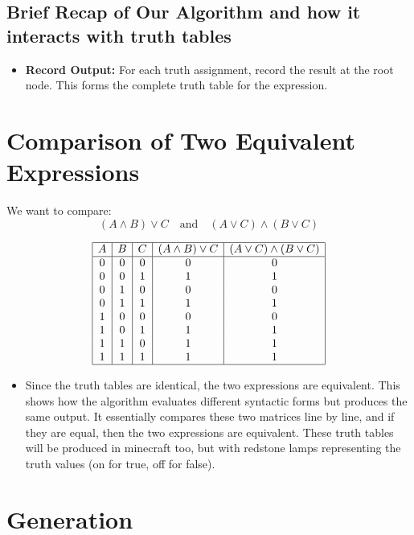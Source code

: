 \documentclass[11pt]{diazessay} %
\begin{document}
\subsection{Brief Recap of Our Algorithm and how it interacts with truth tables}
\begin{itemize}
    \item \textbf{Record Output:} For each truth assignment, record the result at the root node. This forms the complete truth table for the expression. 
\end{itemize}

\section*{Comparison of Two Equivalent Expressions}

We want to compare:
\[
(A \wedge B) \vee C \quad \text{and} \quad (A \vee C) \wedge (B \vee C)
\]

\bigskip

\[
\begin{array}{|c|c|c|c|c|}
\hline
A & B & C & (A \land B) \lor C & (A \lor C) \land (B \lor C) \\
\hline
0 & 0 & 0 & 0 & 0 \\
0 & 0 & 1 & 1 & 1 \\
0 & 1 & 0 & 0 & 0 \\
0 & 1 & 1 & 1 & 1 \\
1 & 0 & 0 & 0 & 0 \\
1 & 0 & 1 & 1 & 1 \\
1 & 1 & 0 & 1 & 1 \\
1 & 1 & 1 & 1 & 1 \\
\hline
\end{array}
\]

\bigskip

\begin{itemize}
    \item Since the truth tables are identical, the two expressions are equivalent.  
This shows how the algorithm evaluates different syntactic forms but produces the same output. It essentially compares these two matrices line by line, and if they are equal, then the two expressions are equivalent.
These truth tables will be produced in minecraft too, but with redstone lamps representing the truth values (on for true, off for false).
\end{itemize}

\section{Generation}
\end{document}
